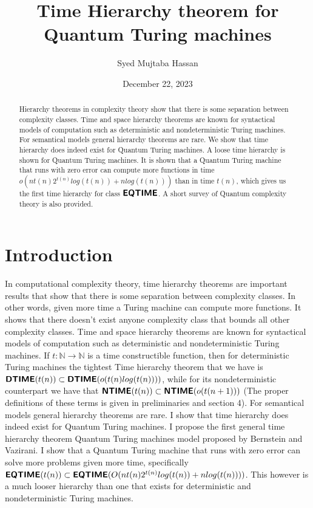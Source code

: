 \documentclass[11pt,a4paper]{article}
\title{Time Hierarchy theorem for Quantum Turing machines}
\author{Syed Mujtaba Hassan}
\date{December 22, 2023}
\newcommand{\classX}[1]{\ensuremath{\text{\textsf{\textbf{#1}}}}}
\newcommand{\EQ}{\classX{EQTIME}}
\newcommand{\D}{\classX{DTIME}}
\newcommand{\N}{\classX{NTIME}}
\begin{document}
\maketitle
\begin{abstract}
    Hierarchy theorems in complexity theory show that there is some separation between complexity classes.
    Time and space hierarchy theorems are known for syntactical models of computation such as deterministic and nondeterministic Turing machines.
    For semantical models general hierarchy theorems are rare. We show that time hierarchy does indeed exist for Quantum Turing machines. A loose time hierarchy is shown for Quantum Turing machines. It is shown that a Quantum Turing machine that runs with zero error can compute more functions in time
    $o(nt(n)2^{t(n)}log(t(n))+nlog(t(n)))$ than in time $t(n)$, which gives us the first time hierarchy for class $\EQ$. A short survey of Quantum complexity theory is also provided.
\end{abstract}

\section{Introduction}
    In computational complexity theory, time hierarchy theorems are important results that show that there is some separation between complexity classes. In other words, given more time a Turing machine can compute more functions.
    It shows that there doesn't exist anyone complexity class that bounds all other complexity classes. Time and space hierarchy theorems are known for syntactical models of computation such as deterministic and nondeterministic Turing machines.
    If $t:\mathbb{N}\to \mathbb{N}$ is a time constructible function, then for deterministic Turing machines the tightest Time hierarchy theorem that we have is $\D(t(n)) \subset \D(o(t(n)log(t(n))))$, while for its nondeterministic counterpart we have that $\N(t(n)) \subset \N(o(t(n+1)))$ (The proper definitions of these terms is given in preliminaries and section 4).
    For semantical models general hierarchy theorems are rare. I show that time hierarchy does indeed exist for Quantum Turing machines. I propose the first general time hierarchy theorem Quantum Turing machines model proposed by Bernstein and Vazirani.
    I show that a Quantum Turing machine that runs with zero error can solve more problems given more time, specifically $\EQ(t(n)) \subset \EQ(O(nt(n)2^{t(n)}log(t(n))+nlog(t(n))))$. This however is a much looser hierarchy than one that exists for deterministic and nondeterministic Turing machines.
\end{document}
